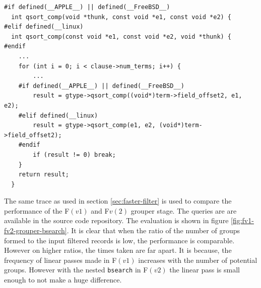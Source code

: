 \begin{lstlisting}
#if defined(__APPLE__) || defined(__FreeBSD__)
  int qsort_comp(void *thunk, const void *e1, const void *e2) {
#elif defined(__linux)
  int qsort_comp(const void *e1, const void *e2, void *thunk) {
#endif
    ...
    for (int i = 0; i < clause->num_terms; i++) {
        ...
    #if defined(__APPLE__) || defined(__FreeBSD__)
        result = gtype->qsort_comp((void*)term->field_offset2, e1, e2);
    #elif defined(__linux)
        result = gtype->qsort_comp(e1, e2, (void*)term->field_offset2);
    #endif
        if (result != 0) break;
    }
    return result;
  }
\end{lstlisting}

The same trace as used in section \ref{sec:faster-filter} is used to compare
the performance of the F$(v1)$ and F$v(2)$ grouper stage. The queries are are
available in the source code repository.  The evaluation is shown in figure
\ref{fig:fv1-fv2-grouper-bsearch}. It is clear that when the ratio of the
number of groups formed to the input filtered records is low, the performance
is comparable. However on higher ratios, the times taken are far apart. It is
because, the frequency of linear passes made in F$(v1)$ increases with the
number of potential groups. However with the nested \texttt{bsearch} in
F$(v2)$ the linear pass is small enough to not make a huge difference.

